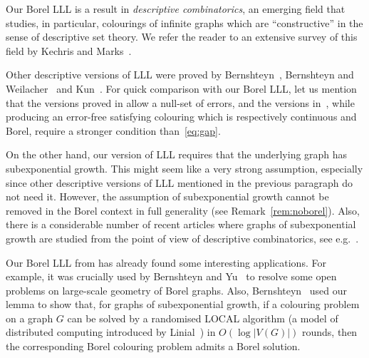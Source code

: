 \documentclass[12pt,a4paper]{article}
\numberwithin{equation}{section}
\theoremstyle{definition}
\begin{document}
    
    Our Borel LLL is a result in %
    \emph{descriptive combinatorics}, an emerging field that studies, in particular, colourings of infinite graphs which are ``constructive'' in the sense of descriptive set theory. We refer the reader to an extensive survey of this field by Kechris and Marks~\cite{KechrisMarks20survey}. 
    
    Other descriptive versions of LLL were proved by Bernshteyn~\cite{Bernshteyn19am,Bernshteyn23a,Bernshteyn23i}, Bernshteyn and Weilacher~\cite{BernshteynWeilacher23} and Kun~\cite{Kun13arxiv}. For quick comparison with our Borel LLL, let us mention that the versions proved in \cite{Kun13arxiv,Bernshteyn19am,Bernshteyn23i} allow a null-set of errors, and the versions in~\cite{Bernshteyn23a,BernshteynWeilacher23}, while producing an error-free satisfying colouring which is respectively continuous and Borel, require a stronger condition than~\eqref{eq:gap}. 
    
    On the other hand, our version of LLL requires that the underlying graph has subexponential growth.  This might seem like a very strong assumption, especially since other descriptive versions of LLL mentioned in the previous paragraph do not need it. However, the assumption of subexponential growth cannot be removed in the Borel context in full generality (see Remark~\ref{rem:noborel}). Also, there is a considerable number of recent articles where graphs of subexponential growth are studied from the point of view of descriptive combinatorics, see e.g.~\cite{ConleyTamuz20,GrebikRozhon21a,GrebikRozhon23a,Thornton22}.
    
    Our Borel LLL from \cite{CsokaGrabowskiMathePikhurkoTyros:arxiv} %
    has already found some interesting applications. For example, it was crucially used by Bernshteyn and Yu~\cite{BernshteynYu23} to resolve some open problems on large-scale geometry of Borel graphs.  
    Also, Bernshteyn~\cite[Theorem 2.15]{Bernshteyn23i} used our lemma to show that, for graphs of subexponential growth, if a colouring problem on a graph $G$ can be solved by a randomised {\sf LOCAL}  algorithm (a model of distributed computing introduced by Linial~\cite{Linial92}) in $O(\log |V(G)|)$ rounds, then the corresponding Borel colouring problem admits a Borel solution.
    
\end{document}
